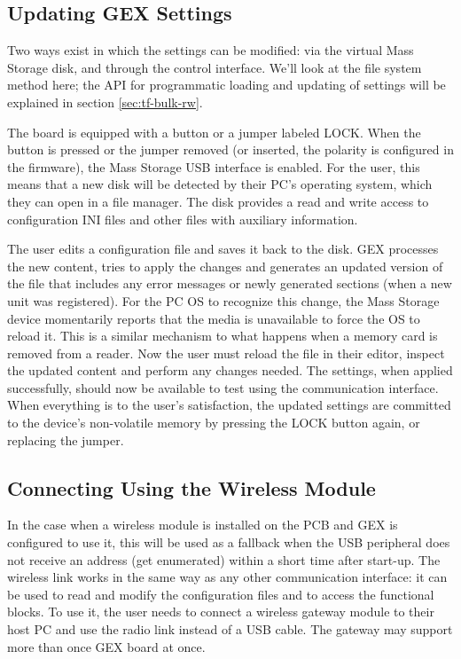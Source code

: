\subsection{Updating GEX Settings}

Two ways exist in which the settings can be modified: via the virtual Mass Storage disk, and through the control interface. We'll look at the file system method here; the API for programmatic loading and updating of settings will be explained in section \ref{sec:tf-bulk-rw}.

The board is equipped with a button or a jumper labeled LOCK. When the button is pressed or the jumper removed (or inserted, the polarity is configured in the firmware), the Mass Storage \gls{USB} interface is enabled. For the user, this means that a new disk will be detected by their \gls{PC}'s operating system, which they can open in a file manager. The disk provides a read and write access to configuration INI files and other files with auxiliary information. 

The user edits a configuration file and saves it back to the disk. GEX processes the new content, tries to apply the changes and generates an updated version of the file that includes any error messages or newly generated sections (when a new unit was registered). For the \gls{PC} \gls{OS} to recognize this change, the Mass Storage device momentarily reports that the media is unavailable to force the \gls{OS} to reload it. This is a similar mechanism to what happens when a memory card is removed from a reader. Now the user must reload the file in their editor, inspect the updated content and perform any changes needed. The settings, when applied successfully, should now be available to test using the communication interface. When everything is to the user's satisfaction, the updated settings are committed to the device's non-volatile memory by pressing the LOCK button again, or replacing the jumper.

\subsection{Connecting Using the Wireless Module}

In the case when a wireless module is installed on the \gls{PCB} and GEX is configured to use it, this will be used as a fallback when the \gls{USB} peripheral does not receive an address (get enumerated) within a short time after start-up. The wireless link works in the same way as any other communication interface: it can be used to read and modify the configuration files and to access the functional blocks. To use it, the user needs to connect a wireless gateway module to their host \gls{PC} and use the radio link instead of a \gls{USB} cable. The gateway may support more than once GEX board at once.

